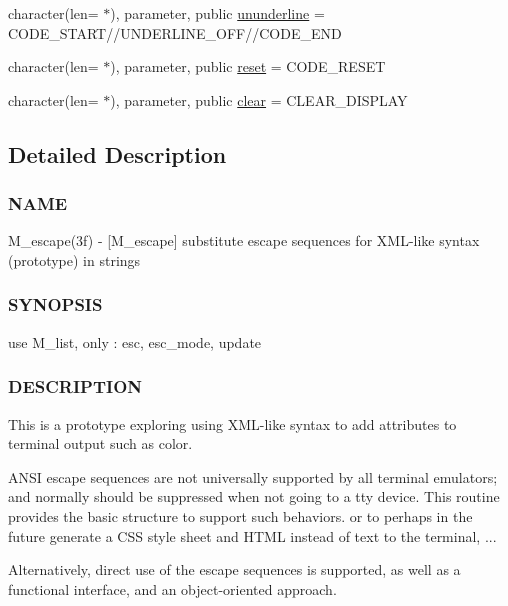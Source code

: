 \begin{DoxyCompactItemize}
\item 
character(len= $\ast$), parameter, public \mbox{\hyperlink{namespacem__escape_adbaa599772d5df6567d75188ac3258bf}{ununderline}} = C\+O\+D\+E\+\_\+\+S\+T\+A\+RT//U\+N\+D\+E\+R\+L\+I\+N\+E\+\_\+\+O\+FF//C\+O\+D\+E\+\_\+\+E\+ND
\item 
character(len= $\ast$), parameter, public \mbox{\hyperlink{namespacem__escape_ae02be34bb084db8024b234bc87058d3a}{reset}} = C\+O\+D\+E\+\_\+\+R\+E\+S\+ET
\item 
character(len= $\ast$), parameter, public \mbox{\hyperlink{namespacem__escape_a49210f3a0332fb37df08c519b3252bef}{clear}} = C\+L\+E\+A\+R\+\_\+\+D\+I\+S\+P\+L\+AY
\end{DoxyCompactItemize}


\subsection{Detailed Description}
\subsubsection*{N\+A\+ME}

M\+\_\+escape(3f) -\/ \mbox{[}M\+\_\+escape\mbox{]} substitute escape sequences for X\+M\+L-\/like syntax (prototype) in strings 

\subsubsection*{S\+Y\+N\+O\+P\+S\+IS}

\begin{DoxyVerb} use M_list, only : esc, esc_mode, update
\end{DoxyVerb}


\subsubsection*{D\+E\+S\+C\+R\+I\+P\+T\+I\+ON}

This is a prototype exploring using X\+M\+L-\/like syntax to add attributes to terminal output such as color.

A\+N\+SI escape sequences are not universally supported by all terminal emulators; and normally should be suppressed when not going to a tty device. This routine provides the basic structure to support such behaviors. or to perhaps in the future generate a C\+SS style sheet and H\+T\+ML instead of text to the terminal, ...

Alternatively, direct use of the escape sequences is supported, as well as a functional interface, and an object-\/oriented approach.

